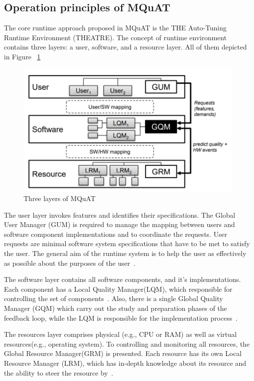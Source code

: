\subsection{Operation principles of MQuAT}
The core runtime approach proposed in MQuAT is the THE Auto-Tuning Runtime Environment (THEATRE)\cite{gotz10, gotz12}.
The concept of runtime environment contains three layers: a user, software, and a resource layer. All of them depicted in Figure ~\ref{fig:threelayersmquat}
\begin{figure}
	\centering
	\includegraphics[width=\textwidth]{images/ThreeLayersMQuAT}
	\caption[Three layers of MQuAT]{Three layers of MQuAT}
	\label{fig:threelayersmquat}
\end{figure}

The user layer invokes features and identifies their specifications. The  Global  User  Manager  (GUM)  is required to manage the mapping between users and software component implementations and to coordinate the requests. User requests are minimal software system specifications that have to be met to satisfy the user. The general aim of the runtime system is to help the user as effectively as possible about the purposes of the user~\cite{gotz13}.

The software layer contains all software components, and it's implementations. Each component has a Local Quality Manager(LQM), which responsible for controlling the set of components~\cite{gotz13, ahmad18}. Also, there is a single Global Quality Manager (GQM) which carry out the study and preparation phases of the feedback loop, while the LQM is responsible for the implementation process~\cite{gotz13}.

The resources layer comprises physical (e.g., CPU or RAM) as well as virtual resources(e.g., operating system).
To controlling and monitoring all resources, the Global Resource Manager(GRM) is presented. Each resource has its own Local Resource Manager (LRM), which has in-depth knowledge about its resource and the ability to steer the resource by~\cite{gotz13, ahmad18}.

